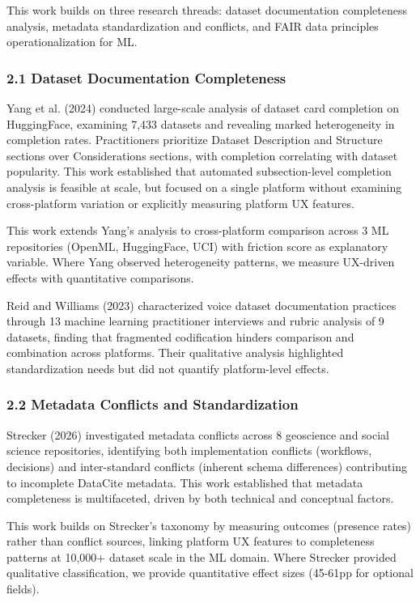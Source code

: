 
This work builds on three research threads: dataset documentation completeness analysis, metadata standardization and conflicts, and FAIR data principles operationalization for ML.

\subsubsection{2.1 Dataset Documentation Completeness}

Yang et al. (2024) conducted large-scale analysis of dataset card completion on HuggingFace, examining 7,433 datasets and revealing marked heterogeneity in completion rates. Practitioners prioritize Dataset Description and Structure sections over Considerations sections, with completion correlating with dataset popularity. This work established that automated subsection-level completion analysis is feasible at scale, but focused on a single platform without examining cross-platform variation or explicitly measuring platform UX features.

This work extends Yang's analysis to cross-platform comparison across 3 ML repositories (OpenML, HuggingFace, UCI) with friction score as explanatory variable. Where Yang observed heterogeneity patterns, we measure UX-driven effects with quantitative comparisons.

Reid and Williams (2023) characterized voice dataset documentation practices through 13 machine learning practitioner interviews and rubric analysis of 9 datasets, finding that fragmented codification hinders comparison and combination across platforms. Their qualitative analysis highlighted standardization needs but did not quantify platform-level effects.

\subsubsection{2.2 Metadata Conflicts and Standardization}

Strecker (2026) investigated metadata conflicts across 8 geoscience and social science repositories, identifying both implementation conflicts (workflows, decisions) and inter-standard conflicts (inherent schema differences) contributing to incomplete DataCite metadata. This work established that metadata completeness is multifaceted, driven by both technical and conceptual factors.

This work builds on Strecker's taxonomy by measuring outcomes (presence rates) rather than conflict sources, linking platform UX features to completeness patterns at 10,000+ dataset scale in the ML domain. Where Strecker provided qualitative classification, we provide quantitative effect sizes (45-61pp for optional fields).

